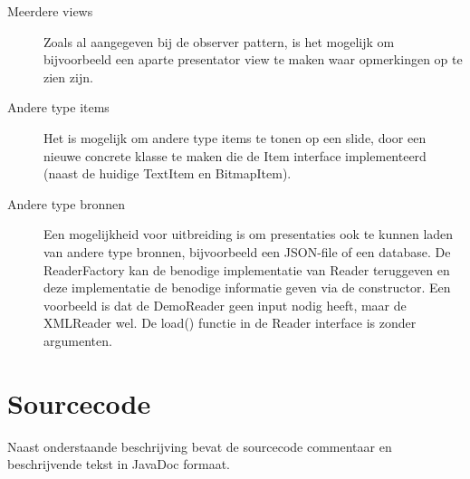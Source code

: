 \documentclass[a4paper]{article}
\begin{document}
\begin{description}
\item[Meerdere views] Zoals al aangegeven bij de observer pattern, is het mogelijk om bijvoorbeeld een aparte presentator view te maken waar opmerkingen op te zien zijn.
\item[Andere type items] Het is mogelijk om andere type items te tonen op een slide, door een nieuwe concrete klasse te maken die de Item interface implementeerd (naast de huidige TextItem en BitmapItem).
\item[Andere type bronnen] Een mogelijkheid voor uitbreiding is om presentaties ook te kunnen laden van andere type bronnen, bijvoorbeeld een JSON-file of een database. De ReaderFactory kan de benodige implementatie van Reader teruggeven en deze implementatie de benodige informatie geven via de constructor. Een voorbeeld is dat de DemoReader geen input nodig heeft, maar de XMLReader wel.  De load() functie in de Reader interface is zonder argumenten.
\end{description}

\section{Sourcecode}
Naast onderstaande beschrijving bevat de sourcecode commentaar en beschrijvende tekst in JavaDoc formaat.
\end{document}
